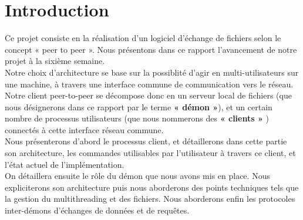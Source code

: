 \chapter{Introduction}
	Ce projet consiste en la réalisation d'un logiciel d'échange de fichiers 
	selon le concept « peer to peer ». Nous présentons dans ce rapport 
	l'avancement de notre projet à la sixième semaine.\\
	
	Notre choix d'architecture se base sur la possiblité d'agir en multi-utilisateurs 
	sur une machine, à travers une interface commune de communication vers le réseau.
	Notre client peer-to-peer se décompose donc en un serveur local de fichiers 
	(que nous désignerons dans ce rapport par le terme \textbf{« démon »}), et un certain 
	nombre de processus utilisateurs (que nous nommerons des \textbf{« clients »} )
	connectés à cette interface réseau commune.\\
	
	Nous présenterons d'abord le processus client, et détaillerons dans cette partie son 
	architecture, les commandes utilisables par l'utilisateur à travers ce client, et
	l'état actuel de l'implémentation.\\
	
	On détaillera ensuite le rôle du démon que nous avons mis en place.
	Nous expliciterons son architecture puis nous aborderons des points 
	techniques tels que la gestion du multithreading et des fichiers. Nous 
	aborderons enfin les protocoles inter-démons d'échanges de données et 
	de requêtes. 
